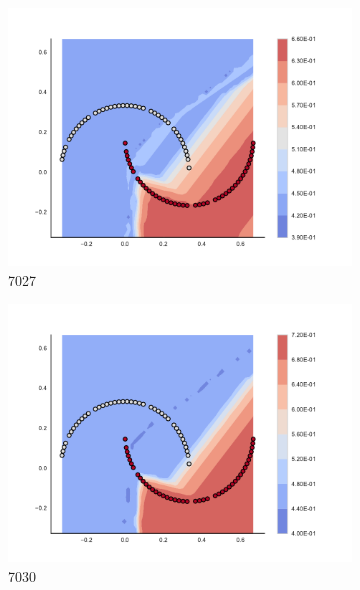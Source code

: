 \begin{figure}[h]
\begin{subfigure}[b]{0.09\textwidth}
    \includegraphics[clip, trim=2.35cm 1.75cm 4.5cm 0cm,width=\textwidth]{img/convergence/7027.pdf}
    \caption{7027}
    \label{fig:convergence_7027}
\end{subfigure}
%
\begin{subfigure}[b]{0.09\textwidth}
    \includegraphics[clip, trim=2.35cm 1.75cm 4.5cm 0cm,width=\textwidth]{img/convergence/7030.pdf}
    \caption{7030}
    \label{fig:convergence_7030}
\end{subfigure}
%
\begin{subfigure}[b]{0.09\textwidth}

\end{subfigure}
\end{figure}
